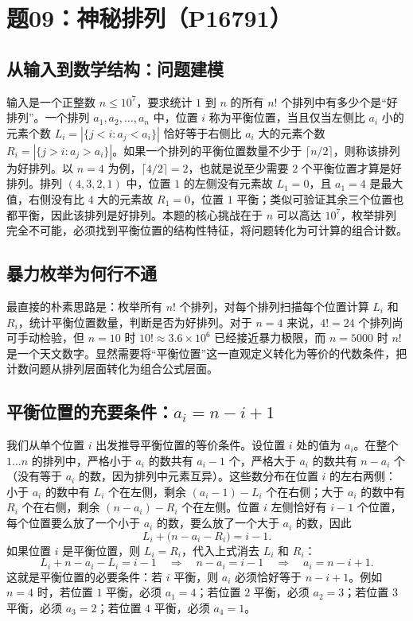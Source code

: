 \section{题09：神秘排列（P16791）}

\subsection{从输入到数学结构：问题建模}

输入是一个正整数 $n \le 10^7$，要求统计 $1$ 到 $n$ 的所有 $n!$ 个排列中有多少个是“好排列”。一个排列 $a_1, a_2, \ldots, a_n$ 中，位置 $i$ 称为平衡位置，当且仅当左侧比 $a_i$ 小的元素个数 $L_i = |\{j < i : a_j < a_i\}|$ 恰好等于右侧比 $a_i$ 大的元素个数 $R_i = |\{j > i : a_j > a_i\}|$。如果一个排列的平衡位置数量不少于 $\lceil n/2 \rceil$，则称该排列为好排列。以 $n = 4$ 为例，$\lceil 4/2 \rceil = 2$，也就是说至少需要 $2$ 个平衡位置才算是好排列。排列 $(4, 3, 2, 1)$ 中，位置 $1$ 的左侧没有元素故 $L_1 = 0$，且 $a_1 = 4$ 是最大值，右侧没有比 $4$ 大的元素故 $R_1 = 0$，位置 $1$ 平衡；类似可验证其余三个位置也都平衡，因此该排列是好排列。本题的核心挑战在于 $n$ 可以高达 $10^7$，枚举排列完全不可能，必须找到平衡位置的结构性特征，将问题转化为可计算的组合计数。

\subsection{暴力枚举为何行不通}

最直接的朴素思路是：枚举所有 $n!$ 个排列，对每个排列扫描每个位置计算 $L_i$ 和 $R_i$，统计平衡位置数量，判断是否为好排列。对于 $n = 4$ 来说，$4! = 24$ 个排列尚可手动检验，但 $n = 10$ 时 $10! \approx 3.6 \times 10^6$ 已经接近暴力极限，而 $n = 5000$ 时 $n!$ 是一个天文数字。显然需要将“平衡位置”这一直观定义转化为等价的代数条件，把计数问题从排列层面转化为组合公式层面。

\subsection{平衡位置的充要条件：$a_i = n - i + 1$}

我们从单个位置 $i$ 出发推导平衡位置的等价条件。设位置 $i$ 处的值为 $a_i$。在整个 $1 \ldots n$ 的排列中，严格小于 $a_i$ 的数共有 $a_i - 1$ 个，严格大于 $a_i$ 的数共有 $n - a_i$ 个（没有等于 $a_i$ 的数，因为排列中元素互异）。这些数分布在位置 $i$ 的左右两侧：小于 $a_i$ 的数中有 $L_i$ 个在左侧，剩余 $(a_i - 1) - L_i$ 个在右侧；大于 $a_i$ 的数中有 $R_i$ 个在右侧，剩余 $(n - a_i) - R_i$ 个在左侧。位置 $i$ 左侧恰好有 $i - 1$ 个位置，每个位置要么放了一个小于 $a_i$ 的数，要么放了一个大于 $a_i$ 的数，因此
\[
L_i + \bigl(n - a_i - R_i\bigr) = i - 1.
\]
如果位置 $i$ 是平衡位置，则 $L_i = R_i$，代入上式消去 $L_i$ 和 $R_i$：
\[
L_i + n - a_i - L_i = i - 1 \quad\Longrightarrow\quad n - a_i = i - 1 \quad\Longrightarrow\quad a_i = n - i + 1.
\]
这就是平衡位置的必要条件：若 $i$ 平衡，则 $a_i$ 必须恰好等于 $n - i + 1$。例如 $n = 4$ 时，若位置 $1$ 平衡，必须 $a_1 = 4$；若位置 $2$ 平衡，必须 $a_2 = 3$；若位置 $3$ 平衡，必须 $a_3 = 2$；若位置 $4$ 平衡，必须 $a_4 = 1$。


